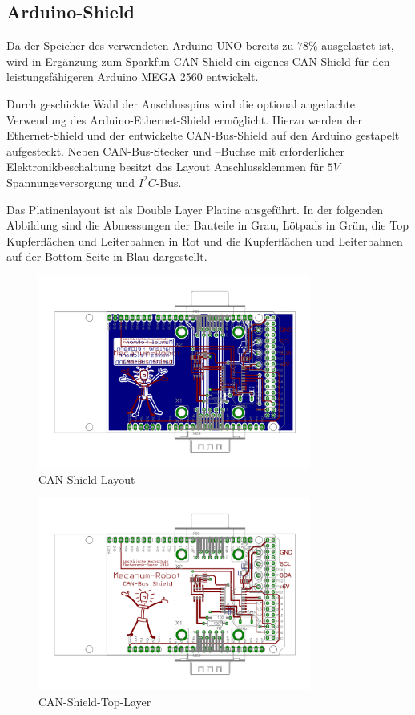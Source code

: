 \subsection{Arduino-Shield}
\label{sec:Arduino-Shield}
Da der Speicher des verwendeten Arduino UNO bereits zu $78\%$ ausgelastet ist, wird in Ergänzung zum Sparkfun CAN-Shield ein eigenes CAN-Shield für den leistungsfähigeren Arduino MEGA 2560 entwickelt.
 
Durch geschickte Wahl der Anschlusspins wird die optional angedachte Verwendung des Arduino-Ethernet-Shield ermöglicht. Hierzu werden der Ethernet-Shield und der entwickelte CAN-Bus-Shield auf den Arduino gestapelt aufgesteckt. Neben CAN-Bus-Stecker und –Buchse mit erforderlicher Elektronikbeschaltung besitzt das Layout Anschlussklemmen für $5V$ Spannungsversorgung und $I^{2}C$-Bus.

Das Platinenlayout ist als Double Layer Platine ausgeführt. In der folgenden Abbildung
sind die Abmessungen der Bauteile  in Grau, Lötpads in Grün, die Top Kupferflächen und Leiterbahnen in Rot und die Kupferflächen  und Leiterbahnen auf der Bottom Seite in Blau dargestellt.

\begin{figure}[H]
\centering
 \includegraphics[width=0.8\textwidth]{Abbildungen/CAN-Shield-Layout} 
\caption[CAN-Shield-Layout]{CAN-Shield-Layout}
\label{fig:CAN-Shield-Layout}
\end{figure}

\begin{figure}[H]
\centering
 \includegraphics[width=0.8\textwidth]{Abbildungen/CAN-Shield-Layout-Top} 
\caption[CAN-Shield-Top-Layer]{CAN-Shield-Top-Layer}
\label{fig:CAN-Shield-Layout-Top}
\end{figure}

